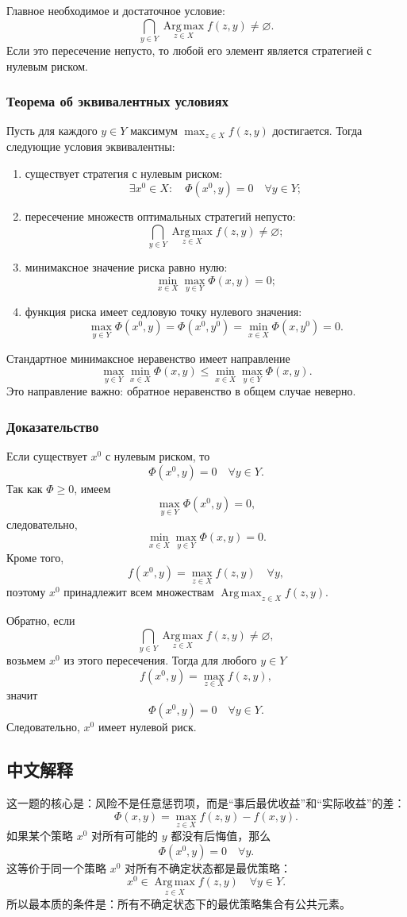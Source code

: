 \documentclass[12pt,a4paper]{article}
\newcommand{\Argmax}{\operatorname*{Arg\,max}}
\begin{document}
Главное необходимое и достаточное условие:
\[
\bigcap_{y\in Y}\Argmax_{z\in X} f(z,y)\ne\varnothing.
\]
Если это пересечение непусто, то любой его элемент является стратегией с нулевым риском.

\subsubsection{Теорема об эквивалентных условиях}
Пусть для каждого $y\in Y$ максимум $\max_{z\in X}f(z,y)$ достигается. Тогда следующие условия эквивалентны:
\begin{enumerate}
  \item существует стратегия с нулевым риском:
  \[
  \exists x^0\in X:\quad \Phi(x^0,y)=0\quad \forall y\in Y;
  \]
  \item пересечение множеств оптимальных стратегий непусто:
  \[
  \bigcap_{y\in Y}\Argmax_{z\in X} f(z,y)\ne\varnothing;
  \]
  \item минимаксное значение риска равно нулю:
  \[
  \min_{x\in X}\max_{y\in Y}\Phi(x,y)=0;
  \]
  \item функция риска имеет седловую точку нулевого значения:
  \[
  \max_{y\in Y}\Phi(x^0,y)=\Phi(x^0,y^0)=\min_{x\in X}\Phi(x,y^0)=0.
  \]
\end{enumerate}

Стандартное минимаксное неравенство имеет направление
\[
\max_{y\in Y}\min_{x\in X}\Phi(x,y)\le
\min_{x\in X}\max_{y\in Y}\Phi(x,y).
\]
Это направление важно: обратное неравенство в общем случае неверно.

\subsubsection{Доказательство}
Если существует $x^0$ с нулевым риском, то
\[
\Phi(x^0,y)=0\quad \forall y\in Y.
\]
Так как $\Phi\ge 0$, имеем
\[
\max_{y\in Y}\Phi(x^0,y)=0,
\]
следовательно,
\[
\min_{x\in X}\max_{y\in Y}\Phi(x,y)=0.
\]
Кроме того,
\[
f(x^0,y)=\max_{z\in X}f(z,y)\quad \forall y,
\]
поэтому $x^0$ принадлежит всем множествам $\Argmax_{z\in X}f(z,y)$.

Обратно, если
\[
\bigcap_{y\in Y}\Argmax_{z\in X}f(z,y)\ne\varnothing,
\]
возьмем $x^0$ из этого пересечения. Тогда для любого $y\in Y$
\[
f(x^0,y)=\max_{z\in X}f(z,y),
\]
значит
\[
\Phi(x^0,y)=0\quad \forall y\in Y.
\]
Следовательно, $x^0$ имеет нулевой риск.

\subsection{中文解释}
这一题的核心是：风险不是任意惩罚项，而是“事后最优收益”和“实际收益”的差：
\[
\Phi(x,y)=\max_{z\in X}f(z,y)-f(x,y).
\]
如果某个策略 $x^0$ 对所有可能的 $y$ 都没有后悔值，那么
\[
\Phi(x^0,y)=0\quad \forall y.
\]
这等价于同一个策略 $x^0$ 对所有不确定状态都是最优策略：
\[
x^0\in\Argmax_{z\in X}f(z,y)\quad \forall y\in Y.
\]
所以最本质的条件是：所有不确定状态下的最优策略集合有公共元素。
\end{document}
